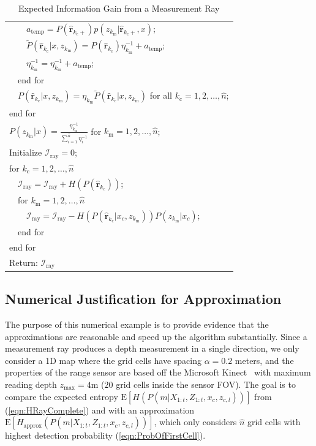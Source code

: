\documentclass[letterpaper, 10pt, conference]{ieeeconf}
\newcommand{\refeqn}[1]{(\ref{eqn:#1})}
\begin{document}
\begin{table}
\begin{tabular}{ l }
   \ \ \ \ $a_\text{temp}=P(\hat{\mathbf{r}}_{k_\text{c}+})p(z_{k_\text{m}}|\hat{\mathbf{r}}_{k_\text{c}+},x)$;\\
   \ \ \ \ $\tilde P(\hat{\mathbf{r}}_{k_\text{c}}|x,z_{k_\text{m}})=P(\hat{\mathbf{r}}_{k_\text{c}})\eta^{-1}_{k_\text{m}}+a_\text{temp}$;\\
   \ \ \ \ $\eta^{-1}_{k_\text{m}}=\eta^{-1}_{k_\text{m}}+a_\text{temp}$;\\
   \ \ end for\\
   \ \ $P(\hat{\mathbf{r}}_{k_\text{c}}|x,z_{k_\text{m}})=\eta_{k_\text{m}}\tilde P(\hat{\mathbf{r}}_{k_\text{c}}|x,z_{k_\text{m}})$ for all $k_\text{c}=1,2,\ldots,\hat n$;\\
   end for\\ 
   $P(z_{k_\text{m}}|x)=\frac{\eta^{-1}_{k_\text{m}}}{\sum_{i=1}^{\hat n}\eta^{-1}_{i}}$ for $k_\text{m}=1,2,\ldots,\hat n$;\\
   
   Initialize $\mathcal I_\text{ray}=0$;\\
   for $k_\text{c}=1,2,\ldots,\hat n$\\
   \ \ $\mathcal I_\text{ray}=\mathcal I_\text{ray}+H(P(\hat{\mathbf{r}}_{k_\text{c}}))$;\\
   \ \ for $k_\text{m}=1,2,\ldots,\hat n$\\
   \ \ \ \ $\mathcal I_\text{ray} = \mathcal I_\text{ray}-H(P(\hat{\mathbf{r}}_{k_\text{c}}|x_c,z_{k_\text{m}}))P(z_{k_\text{m}}|x_{c})$;\\
   \ \ end for\\
  end for\\
  Return: $\mathcal I_\text{ray}$\\
\end{tabular}
\caption{Expected Information Gain from a Measurement Ray}
\label{tab:RayExpectedEntropyGain}
\end{table}



\subsection{Numerical Justification for Approximation}

The purpose of this numerical example is to provide evidence that the approximations are reasonable and speed up the algorithm substantially.
Since a measurement ray produces a depth measurement in a single direction, we only consider a 1D map where the grid cells have spacing $\alpha=0.2$ meters, and the properties of the range sensor are based off the Microsoft Kinect~\cite{PirRutBisSch11,KhoElb12} with maximum reading depth $z_\text{max}=4$m ($20$ grid cells inside the sensor FOV). The goal is to compare the expected entropy $\text{E}[H(P(m|X_{1:t},Z_{1:t},x_c,z_{c,l}))]$ from \refeqn{HRayComplete} and with an approximation $\text{E}[H_\text{approx}(P(m|X_{1:t},Z_{1:t},x_c,z_{c,l}))]$, which only considers $\hat n$ grid cells with highest detection probability \refeqn{ProbOfFirstCell}.
\end{document}

